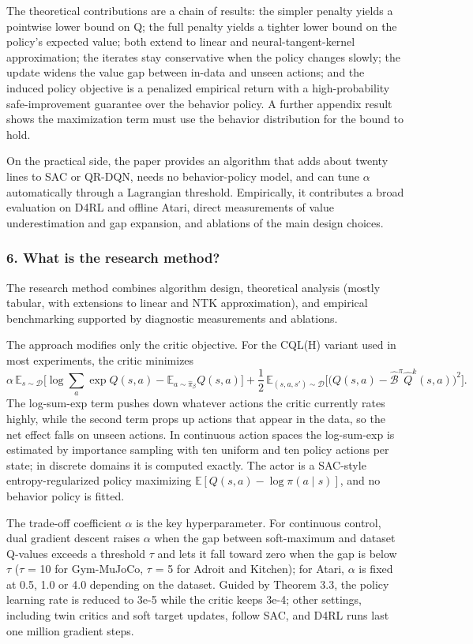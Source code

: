 \documentclass[11pt]{article}
\newcommand{\question}[1]{\subsubsection*{#1}}
\begin{document}
The theoretical contributions are a chain of results: the simpler penalty yields a pointwise lower bound on Q; the full penalty yields a tighter lower bound on the policy's expected value; both extend to linear and neural-tangent-kernel approximation; the iterates stay conservative when the policy changes slowly; the update widens the value gap between in-data and unseen actions; and the induced policy objective is a penalized empirical return with a high-probability safe-improvement guarantee over the behavior policy. A further appendix result shows the maximization term must use the behavior distribution for the bound to hold.

On the practical side, the paper provides an algorithm that adds about twenty lines to SAC or QR-DQN, needs no behavior-policy model, and can tune \ensuremath{\alpha} automatically through a Lagrangian threshold. Empirically, it contributes a broad evaluation on D4RL and offline Atari, direct measurements of value underestimation and gap expansion, and ablations of the main design choices.

\question{6. What is the research method?}

The research method combines algorithm design, theoretical analysis (mostly tabular, with extensions to linear and NTK approximation), and empirical benchmarking supported by diagnostic measurements and ablations.

The approach modifies only the critic objective. For the CQL(H) variant used in most experiments, the critic minimizes \begin{equation*}\alpha\,\mathbb{E}_{s\sim\mathcal{D}}\Big[\log\sum_{a}\exp Q(s,a)-\mathbb{E}_{a\sim\hat{\pi}_{\beta}}Q(s,a)\Big]+\frac{1}{2}\,\mathbb{E}_{(s,a,s')\sim\mathcal{D}}\Big[\big(Q(s,a)-\hat{\mathcal{B}}^{\pi}\hat{Q}^{k}(s,a)\big)^{2}\Big].\end{equation*} The log-sum-exp term pushes down whatever actions the critic currently rates highly, while the second term props up actions that appear in the data, so the net effect falls on unseen actions. In continuous action spaces the log-sum-exp is estimated by importance sampling with ten uniform and ten policy actions per state; in discrete domains it is computed exactly. The actor is a SAC-style entropy-regularized policy maximizing $\mathbb{E}[Q(s,a)-\log\pi(a\mid s)]$, and no behavior policy is fitted.

The trade-off coefficient \ensuremath{\alpha} is the key hyperparameter. For continuous control, dual gradient descent raises \ensuremath{\alpha} when the gap between soft-maximum and dataset Q-values exceeds a threshold \ensuremath{\tau} and lets it fall toward zero when the gap is below \ensuremath{\tau} (\ensuremath{\tau} = 10 for Gym-MuJoCo, \ensuremath{\tau} = 5 for Adroit and Kitchen); for Atari, \ensuremath{\alpha} is fixed at 0.5, 1.0 or 4.0 depending on the dataset. Guided by Theorem 3.3, the policy learning rate is reduced to 3e-5 while the critic keeps 3e-4; other settings, including twin critics and soft target updates, follow SAC, and D4RL runs last one million gradient steps.
\end{document}
